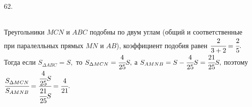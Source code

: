 62. \begin{figure}[ht!]
\end{figure}\\
Треугольники $MCN$ и $ABC$ подобны по двум углам (общий и соответственные при паралелльных прямых $MN$ и $AB$), коэффициент подобия равен $\cfrac{2}{3+2}=\cfrac{2}{5}.$ Тогда если $S_{\Delta ABC}=S,$ то $S_{\Delta MCN}=\cfrac{4}{25}S,$ а $S_{AMNB}=S-\cfrac{4}{25}S=\cfrac{21}{25}S,$ поэтому $\cfrac{S_{\Delta MCN}}{S_{AMNB}}=\cfrac{\cfrac{4}{25}S}{\cfrac{21}{25}S}=\cfrac{4}{21}.$\\
